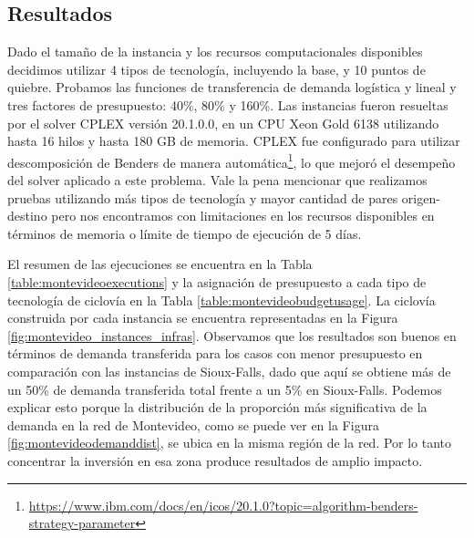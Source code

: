 \subsection{Resultados}

Dado el tamaño de la instancia y los recursos computacionales disponibles decidimos utilizar 4 tipos de tecnología, incluyendo la base, y 10 puntos de quiebre. Probamos las funciones de transferencia de demanda logística y lineal y tres factores de presupuesto: 40\%, 80\% y 160\%. Las instancias fueron resueltas por el solver CPLEX versión 20.1.0.0, en un CPU Xeon Gold 6138 utilizando hasta 16 hilos y hasta 180 GB de memoria. CPLEX fue configurado para utilizar descomposición de Benders de manera automática\footnote{\url{https://www.ibm.com/docs/en/icos/20.1.0?topic=algorithm-benders-strategy-parameter}}, lo que mejoró el desempeño del solver aplicado a este problema. Vale la pena mencionar que realizamos pruebas utilizando más tipos de tecnología y mayor cantidad de pares origen-destino pero nos encontramos con limitaciones en los recursos disponibles en términos de memoria o límite de tiempo de ejecución de 5 días.

El resumen de las ejecuciones se encuentra en la Tabla \ref{table:montevideoexecutions} y la asignación de presupuesto a cada tipo de tecnología de ciclovía en la Tabla \ref{table:montevideobudgetusage}. La ciclovía construida por cada instancia se encuentra representadas en la Figura \ref{fig:montevideo_instances_infras}. Observamos que los resultados son buenos en términos de demanda transferida para los casos con menor presupuesto en comparación con las instancias de Sioux-Falls, dado que aquí se obtiene más de un 50\% de demanda transferida total frente a un 5\% en Sioux-Falls. Podemos explicar esto porque la distribución de la proporción más significativa de la demanda en la red de Montevideo, como se puede ver en la Figura \ref{fig:montevideodemanddist}, se ubica en la misma región de la red. Por lo tanto concentrar la inversión en esa zona produce resultados de amplio impacto.

